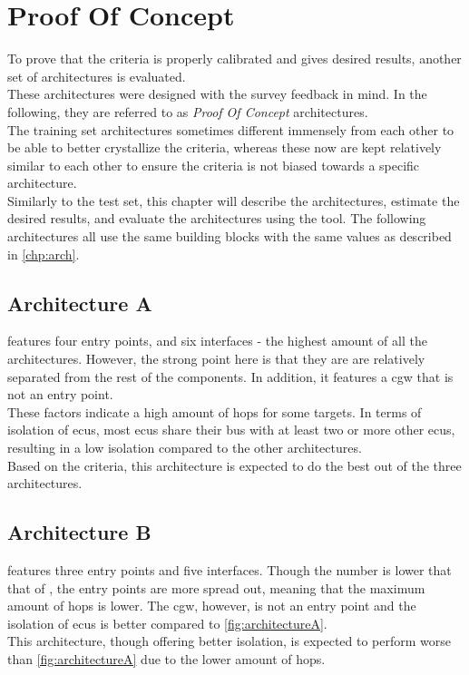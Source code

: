 \chapter{Proof Of Concept}
\label{chp:compeval}

To prove that the criteria is properly calibrated and gives desired results, another set of architectures is evaluated.\\
These architectures were designed with the survey feedback in mind.
In the following, they are referred to as \textit{Proof Of Concept} architectures.\\
The training set architectures sometimes different immensely from each other to be able to better crystallize the criteria,
whereas these now are kept relatively similar to each other to ensure the criteria is not biased towards a specific architecture.\\
Similarly to the test set, this chapter will describe the architectures, estimate the desired results, and evaluate the architectures using the tool.
The following architectures all use the same building blocks with the same values as described in \ref{chp:arch}.

\section{Architecture A}
\label{sec:archa}

 features four entry points, and six interfaces - the highest amount of all the architectures.
However, the strong point here is that they are are relatively separated from the rest of the components.
In addition, it features a \gls{cgw} that is not an entry point.\\
These factors indicate a high amount of hops for some targets.
In terms of isolation of \gls{ecu}s, most \gls{ecu}s share their bus with at least two or more other \gls{ecu}s, resulting in a low isolation compared to the other architectures.\\
Based on the criteria, this architecture is expected to do the best out of the three architectures.

\section{Architecture B}
\label{sec:archb}

 features three entry points and five interfaces.
Though the number is lower that that of , the entry points are more spread out, meaning that the maximum amount of hops is lower.
The \gls{cgw}, however, is not an entry point and the isolation of \gls{ecu}s is better compared to \ref{fig:architectureA}.\\
This architecture, though offering better isolation, is expected to perform worse than \ref{fig:architectureA} due to the lower amount of hops.

